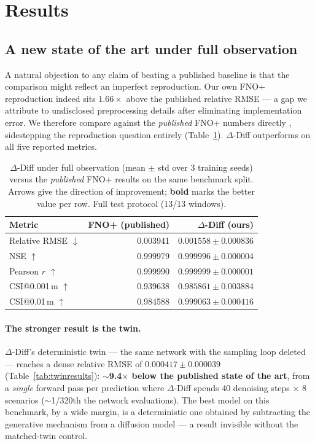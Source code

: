 \documentclass[11pt]{article}
\newcommand{\ours}{\mbox{$\Delta$-Diff}}       %
\begin{document}
\section{Results}
\label{sec:results}

\subsection{A new state of the art under full observation}
\label{sec:vsfnoplus}
A natural objection to any claim of beating a published baseline is that
the comparison might reflect an imperfect reproduction. Our own FNO+
reproduction indeed sits $1.66\times$ above the published relative RMSE
--- a gap we attribute to undisclosed preprocessing details after
eliminating implementation error. We therefore compare against the
\emph{published} FNO+ numbers directly \citep{floodcastbench2025},
sidestepping the reproduction question entirely
(Table~\ref{tab:vsfnoplus}). \ours{} outperforms on all five reported
metrics.

\begin{table}[H]
\centering
\caption{\ours{} under full observation (mean $\pm$ std over 3 training
seeds) versus the \emph{published} FNO+ results on the same benchmark
split. Arrows give the direction of improvement; \textbf{bold} marks the
better value per row. Full test protocol (13/13 windows).}
\label{tab:vsfnoplus}
\begin{tabular}{lrr}
\toprule
Metric & FNO+ (published) & \ours{} (ours) \\
\midrule
Relative RMSE $\downarrow$ & 0.003941 & $\mathbf{0.001558 \pm 0.000836}$ \\
NSE $\uparrow$              & 0.999979 & $\mathbf{0.999996 \pm 0.000004}$ \\
Pearson $r$ $\uparrow$      & 0.999990 & $\mathbf{0.999999 \pm 0.000001}$ \\
CSI@0.001\,m $\uparrow$     & 0.939638 & $\mathbf{0.985861 \pm 0.003884}$ \\
CSI@0.01\,m $\uparrow$      & 0.984588 & $\mathbf{0.999063 \pm 0.000416}$ \\
\bottomrule
\end{tabular}
\end{table}

\paragraph{The stronger result is the twin.} \ours{}'s deterministic twin
--- the same network with the sampling loop deleted --- reaches a dense
relative RMSE of $0.000417 \pm 0.000039$ (Table~\ref{tab:twinresults}):
$\sim$\textbf{9.4$\times$ below the published state of the art}, from a
\emph{single} forward pass per prediction where \ours{} spends 40
denoising steps $\times$ 8 scenarios ($\sim$1/320th the network
evaluations). The best model on this benchmark, by a wide margin, is a
deterministic one obtained by subtracting the generative mechanism from a
diffusion model --- a result invisible without the matched-twin control.
\end{document}

